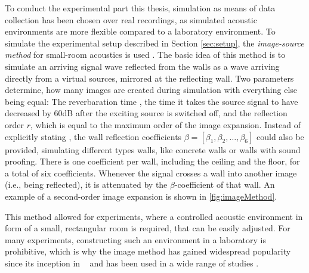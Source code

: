 To conduct the experimental part this thesis, simulation as means of data collection has been chosen over real recordings, as simulated acoustic environments are more flexible compared to a laboratory environment. To simulate the experimental setup  described in Section \ref{sec:setup}, the \emph{image-source method} for small-room acoustics is used \cite{Allen1979}. The basic idea of this method is to simulate an arriving signal wave reflected from the walls as a wave arriving directly from a virtual sources, mirrored at the reflecting wall. Two parameters determine, how many images are created during simulation with everything else being equal: The reverbaration time \Tsixty, the time it takes the source signal to have decreased by 60dB after the exciting source is switched off, and the reflection order $r$, which is equal to the maximum order of the image expansion. Instead of explicitly stating \Tsixty, the wall reflection coefficients $\beta = [\beta_1, \beta_2,\dots,\beta_6]$ could also be provided, simulating different types walls, like concrete walls or walls with sound proofing. There is one coefficient per wall, including the ceiling and the floor, for a total of six coefficients. Whenever the signal crosses a wall into another image (i.e., being reflected), it is attenuated by the $\beta$-coefficient of that wall. An example of a second-order image expansion is shown in \autoref{fig:imageMethod}.

This method allowed for experiments, where a controlled acoustic environment in form of a small, rectangular room is required, that can be easily adjusted. For many experiments, constructing such an environment in a laboratory is prohibitive, which is why the image method has gained widespread popularity since its inception in \citeyear{Allen1979}~\cite{Allen1979} and has been used in a wide range of studies \cite{Champagne1996}.


